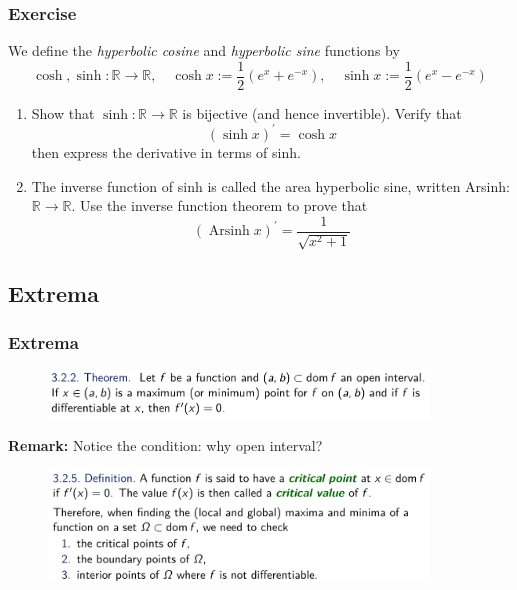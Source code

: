\documentclass[10pt, t]{beamer}
\renewcommand{\emph}[1]{{\color{themecolor}\textsl{#1}}}
\begin{document}
\begin{frame}
    \frametitle{Exercise}

    We define the \emph{hyperbolic cosine} and \emph{hyperbolic sine} functions by
    $$\cosh , \sinh : \mathbb{R} \rightarrow \mathbb{R}, \quad \cosh x:=\frac{1}{2}\left(e^{x}+e^{-x}\right), \quad \sinh x:=\frac{1}{2}\left(e^{x}-e^{-x}\right)$$
    \begin{enumerate}
        \item
              Show that $\sinh : \mathbb{R} \rightarrow \mathbb{R}$ is bijective (and hence invertible). Verify that
              $$
                  (\sinh x)^{\prime}=\cosh x
              $$
              then express the derivative in terms of sinh.
        \item
              The inverse function of sinh is called the area hyperbolic sine, written Arsinh: $\mathbb{R} \rightarrow \mathbb{R}$. Use the inverse function theorem to prove that
              $$
                  (\operatorname{Arsinh} x)^{\prime}=\frac{1}{\sqrt{x^{2}+1}}
              $$
    \end{enumerate}
\end{frame}

\subsection{Extrema}
\begin{frame}
    \frametitle{Extrema}

    \begin{figure}[H]
        \centering
        \includegraphics[width=0.9\textwidth]{2020-11-04-11-56-14.png}
    \end{figure}

    \textbf{Remark:} Notice the condition: why open interval?

    \begin{figure}[H]
        \centering
        \includegraphics[width=0.9\textwidth]{2020-11-04-12-07-34.png}
    \end{figure}

\end{frame}
\end{document}
